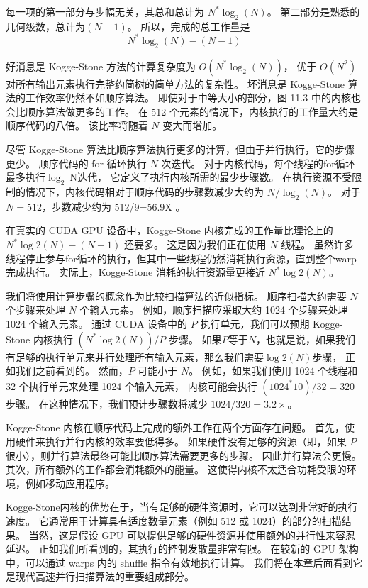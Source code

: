 每一项的第一部分与步幅无关，其总和总计为 $N^{*} \log _{2}(N)$。 
第二部分是熟悉的几何级数，总计为$(N-1)$。 所以，完成的总工作量是
$$
N^{*} \log _{2}(N)-(N-1)
$$

好消息是 Kogge-Stone 方法的计算复杂度为 $O\left(N^{*} \log _{2}(N)\right)$，
优于 $O\left(N^{ 2}\right)$ 对所有输出元素执行完整约简树的简单方法的复杂性。 
坏消息是 Kogge-Stone 算法的工作效率仍然不如顺序算法。 
即使对于中等大小的部分，图 11.3 中的内核也会比顺序算法做更多的工作。 
在 512 个元素的情况下，内核执行的工作量大约是顺序代码的八倍。 该比率将随着 $N$ 变大而增加。

尽管 Kogge-Stone 算法比顺序算法执行更多的计算，但由于并行执行，它的步骤更少。 
顺序代码的 for 循环执行 $N$ 次迭代。 对于内核代码，每个线程的for循环最多执行$\log _{2} \mathrm{~N}$迭代，
它定义了执行内核所需的最少步骤数。 
在执行资源不受限制的情况下，内核代码相对于顺序代码的步骤数减少大约为 $N / \log _{2}(N)$。 
对于 $N=512$，步数减少约为 512/9=56.9X 。

在真实的 CUDA GPU 设备中，Kogge-Stone 内核完成的工作量比理论上的 $N^{*} \log 2(N)-(N-1)$ 还要多。 
这是因为我们正在使用 $N$ 线程。 
虽然许多线程停止参与for循环的执行，但其中一些线程仍然消耗执行资源，直到整个warp完成执行。 
实际上，Kogge-Stone 消耗的执行资源量更接近 $N^{*} \log 2(N)$。

我们将使用计算步骤的概念作为比较扫描算法的近似指标。 顺序扫描大约需要 $N$ 个步骤来处理 $N$ 个输入元素。 
例如，顺序扫描应采取大约 1024 个步骤来处理 1024 个输入元素。 
通过 CUDA 设备中的 $P$ 执行单元，我们可以预期 Kogge-Stone 内核执行 $\left(N^{*} \log 2(N)\right) / P$ 步骤。 
如果$P$等于$N$，也就是说，如果我们有足够的执行单元来并行处理所有输入元素，那么我们需要$\log 2(N)$步骤，
正如我们之前看到的。 然而，$P$ 可能小于 $N$。 
例如，如果我们使用 1024 个线程和 32 个执行单元来处理 1024 个输入元素，
内核可能会执行 $\left(1024^{*} 10\right) / 32=320$ 步骤。 
在这种情况下，我们预计步骤数将减少 $1024 / 320=3.2 \times$。

Kogge-Stone 内核在顺序代码上完成的额外工作在两个方面存在问题。 首先，使用硬件来执行并行内核的效率要低得多。 
如果硬件没有足够的资源（即，如果 $P$ 很小），则并行算法最终可能比顺序算法需要更多的步骤。 因此并行算法会更慢。 
其次，所有额外的工作都会消耗额外的能量。 这使得内核不太适合功耗受限的环境，例如移动应用程序。

Kogge-Stone内核的优势在于，当有足够的硬件资源时，它可以达到非常好的执行速度。 
它通常用于计算具有适度数量元素（例如 512 或 1024）的部分的扫描结果。
当然，这是假设 GPU 可以提供足够的硬件资源并使用额外的并行性来容忍延迟。 正如我们所看到的，其执行的控制发散量非常有限。 
在较新的 GPU 架构中，可以通过 warps 内的 shuffle 指令有效地执行计算。 
我们将在本章后面看到它是现代高速并行扫描算法的重要组成部分。

